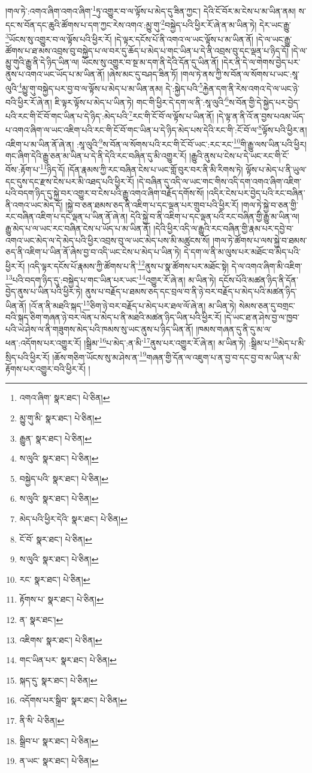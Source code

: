 །གལ་ཏེ་:འགའ་ཞིག་འགའ་ཞིག་\footnote{འགའ་ཞིག་  སྣར་ཐང་།  པེ་ཅིན། }ཏུ་འགྱུར་བ་ལ་ལྟོས་པ་མེད་དུ་ཟིན་ཀྱང་། དེའི་ངོ་བོར་མ་ངེས་པ་མ་ཡིན་ནམ། ས་དང་ས་བོན་དང་ཆུའི་ཚོགས་པ་དག་ཀྱང་རེས་འགའ་:མྱུ་གུ་\footnote{མྱུ་གུ་མི་  སྣར་ཐང་།  པེ་ཅིན། }བསྐྱེད་པའི་ཕྱིར་རོ་ཞེ་ན་མ་ཡིན་ཏེ། དེར་ཡང་རྒྱུ་\footnote{རྒྱུན་  སྣར་ཐང་།  པེ་ཅིན། }ཡོངས་སུ་འགྱུར་བ་ལ་ལྟོས་པའི་ཕྱིར་རོ། །དེ་ལྟར་དངོས་པོ་ནི་འགའ་ལ་ཡང་ལྟོས་པ་མ་ཡིན་ནོ། །དེ་ལ་ཡང་རྒྱུ་ཚོགས་པ་ཐ་མས་འབྲས་བུ་བསྐྱེད་པ་ལ་བར་དུ་ཆོད་པ་མེད་པ་གང་ཡིན་པ་དེ་ནི་འབྲས་བུ་དང་ལྡན་པ་ཉིད་དོ། །དེ་ལ་མྱུ་གུའི་རྒྱུ་ནི་དེ་ཉིད་ཡིན་ལ། ཡོངས་སུ་འགྱུར་བ་སྔ་མ་དག་ནི་དེའི་དོན་དུ་ཡིན་ནོ། །དེར་ནི་དེ་ལ་གེགས་བྱེད་པར་ནུས་པ་འགའ་ཡང་ཡོད་པ་མ་ཡིན་ནོ། །ཞེས་མང་དུ་བཤད་ཟིན་ཏོ། །གལ་ཏེ་ནས་ཀྱི་ས་བོན་ལ་སོགས་པ་ཡང་:སཱ་ལུའི་\footnote{ས་ལུའི་  སྣར་ཐང་།  པེ་ཅིན། }མྱུ་གུ་བསྐྱེད་པར་བྱ་བ་ལ་ལྟོས་པ་མེད་པ་མ་ཡིན་ནམ། དེ་:སྐྱེད་པའི་\footnote{བསྐྱེད་པའི་  སྣར་ཐང་།  པེ་ཅིན། }རྐྱེན་དག་ནི་རེས་འགའ་དེ་ལ་ཡང་ཉེ་བའི་ཕྱིར་རོ་ཞེ་ན། ཇི་ལྟར་ལྟོས་པ་མེད་པ་ཡིན་ཏེ། གང་གི་ཕྱིར་དེ་དག་ལ་ནི་:སཱ་ལུའི་\footnote{ས་ལུའི་  སྣར་ཐང་།  པེ་ཅིན། }ས་བོན་གྱི་དེ་སྐྱེད་པར་བྱེད་པའི་རང་གི་ངོ་བོ་གང་ཡིན་པ་དེ་ཉིད་:མེད་པའི་\footnote{མེད་པའི་ཕྱིར་དེའི་  སྣར་ཐང་།  པེ་ཅིན། }རང་གི་ངོ་བོ་ལ་ལྟོས་པ་ཡིན་ནོ། །དེ་ལྟ་ན་ནི་འོ་ན་བྱས་པའམ་ཡོད་པ་འགའ་ཞིག་ལ་ཡང་འཇིག་པའི་རང་གི་ངོ་བོ་གང་ཡིན་པ་དེ་ཉིད་མེད་པས་དེའི་རང་གི་:ངོ་བོ་ལ་\footnote{ངོ་བོ་  སྣར་ཐང་།  པེ་ཅིན། }ལྟོས་པའི་ཕྱིར་ན། འཇིག་པ་མ་ཡིན་ནོ་ཞེ་ན། :སཱ་ལུའི་\footnote{ས་ལུའི་  སྣར་ཐང་།  པེ་ཅིན། }ས་བོན་ལ་སོགས་པའི་རང་གི་ངོ་བོ་ཡང་:རང་རང་\footnote{རང་  སྣར་ཐང་།  པེ་ཅིན། }གི་རྒྱུ་ལས་ཡིན་པའི་ཕྱིར། གང་ཞིག་དེའི་རྒྱུ་ཅན་མ་ཡིན་པ་དེ་ནི་དེའི་རང་བཞིན་དུ་མི་འགྱུར་རོ། །རྒྱུའི་ནུས་པ་ངེས་པ་དེ་ཡང་རང་གི་ངོ་བོས་:རྟོག་པ་\footnote{རྟོགས་པ་  སྣར་ཐང་།  པེ་ཅིན། }ཉིད་དོ། །དོན་རྣམས་ཀྱི་རང་བཞིན་ངེས་པ་ཡང་གློ་བུར་བར་ནི་མི་རིགས་ཏེ། ལྟོས་པ་མེད་པ་ནི་ཡུལ་དང་དུས་དང་རྫས་ངེས་པར་མི་འཐད་པའི་ཕྱིར་རོ། །དེ་བཞིན་དུ་འདི་ལ་ཡང་གང་གིས་འདི་དག་འགའ་ཞིག་འཇིག་པའི་བདག་ཉིད་དུ་སྐྱེ་བར་འགྱུར་བ་ངེས་པའི་རྒྱུ་འགའ་ཞིག་བརྗོད་དགོས་སོ། །འདིར་ངེས་པར་བྱེད་པའི་རང་བཞིན་ནི་འགའ་ཡང་མེད་དོ། །སྐྱེ་བ་ཅན་ཐམས་ཅད་ནི་འཇིག་པ་དང་ལྡན་པར་གྲུབ་པའི་ཕྱིར་རོ། །གལ་ཏེ་སྐྱེ་བ་ཅན་གྱི་རང་བཞིན་འཇིག་པ་དང་ལྡན་པ་ཡིན་ནོ་ཞེ་ན། དེའི་སྐྱེ་བ་ནི་འཇིག་པ་དང་ལྡན་པའི་རང་བཞིན་གྱི་རྒྱུ་མ་ཡིན་ལ། རྒྱུ་མེད་པ་ལ་ཡང་རང་བཞིན་ངེས་པ་ཡོད་པ་མ་ཡིན་ནོ། །དེའི་ཕྱིར་འདི་ལ་རྒྱུའི་རང་བཞིན་གྱི་རྣམ་པར་དབྱེ་བ་འགའ་ཡང་མེད་ལ་དེ་མེད་པའི་ཕྱིར་འབྲས་བུ་ལ་ཡང་མེད་པས་མི་མཚུངས་སོ། །གལ་ཏེ་ཚོགས་པ་ལས་སྐྱེ་བ་ཐམས་ཅད་ནི་འཇིག་པ་ཡིན་ནོ་ཞེས་བྱ་བ་འདི་ཡང་ངེས་པ་མེད་པ་ཡིན་ཏེ། དེ་དག་ལ་ནི་མ་ལུས་པར་མཐོང་བ་མེད་པའི་ཕྱིར་རོ། །འདི་ལྟར་དངོས་པོ་རྣམས་ཀྱི་ཚོགས་པ་ནི་\footnote{ན་  སྣར་ཐང་། }ནུས་པ་སྣ་ཚོགས་པར་མཐོང་སྟེ། དེ་ལ་འགའ་ཞིག་མི་འཇིག་\footnote{འཇིགས་  སྣར་ཐང་།  པེ་ཅིན། }པའི་བདག་ཉིད་དུ་:བསྐྱེད་པ་གང་ཡིན་པར་ཡང་\footnote{གང་ཡིན་པར་  སྣར་ཐང་།  པེ་ཅིན། }འགྱུར་རོ་ཞེ་ན། མ་ཡིན་ཏེ། དངོས་པོའི་མཚན་ཉིད་ནི་དོན་བྱེད་ནུས་པ་ཡིན་པའི་ཕྱིར་ཏེ། ནུས་པ་བརྗོད་པ་ཐམས་ཅད་དང་བྲལ་བ་ནི་ཉེ་བར་བརྗོད་པ་མེད་པའི་མཚན་ཉིད་ཡིན་ནོ། །འོ་ན་ནི་མཐའི་སྐད་\footnote{སྐད་དུ་  སྣར་ཐང་།  པེ་ཅིན། }ཅིག་ཉེ་བར་བརྗོད་པ་མེད་པར་ཐལ་ལོ་ཞེ་ན། མ་ཡིན་ཏེ། སེམས་ཅན་དུ་བགྲང་བའི་སྐད་ཅིག་གཞན་ཉེ་བར་ལེན་པ་མེད་པ་ནི་མཐའི་མཚན་ཉིད་ཡིན་པའི་ཕྱིར་རོ། །དེ་ཡང་ཐ་ན་ཤེས་བྱ་ལ་ཁྱབ་པའི་ཡེ་ཤེས་ལ་ནི་གཟུགས་མེད་པའི་ཁམས་སུ་ཡང་ནུས་པ་ཉིད་ཡིན་ནོ། །ཁམས་གཞན་དུ་ནི་དུ་མ་ལ་ཕན་:འདོགས་པར་འགྱུར་རོ། །སྒྲིམ་\footnote{འདོགས་པར་སྒྲིབ་  སྣར་ཐང་།  པེ་ཅིན། }པ་མེད་:ན་མི་\footnote{ནི་སི་  པེ་ཅིན། }ནུས་པར་འགྱུར་རོ་ཞེ་ན། མ་ཡིན་ཏེ། :སྒྲིམ་པ་\footnote{སྒྲིབ་པ་  སྣར་ཐང་།  པེ་ཅིན། }མེད་པ་མི་སྲིད་པའི་ཕྱིར་རོ། །ཆོས་གཅིག་ཡོངས་སུ་མ་ཤེས་ན་\footnote{ན་ཡང་  སྣར་ཐང་།  པེ་ཅིན། }གཞན་གྱི་དོན་ལ་འཇུག་པ་ན་བྱ་བ་དང་བྱ་བ་མ་ཡིན་པ་མི་རྟོགས་པར་འགྱུར་བའི་ཕྱིར་རོ། །
